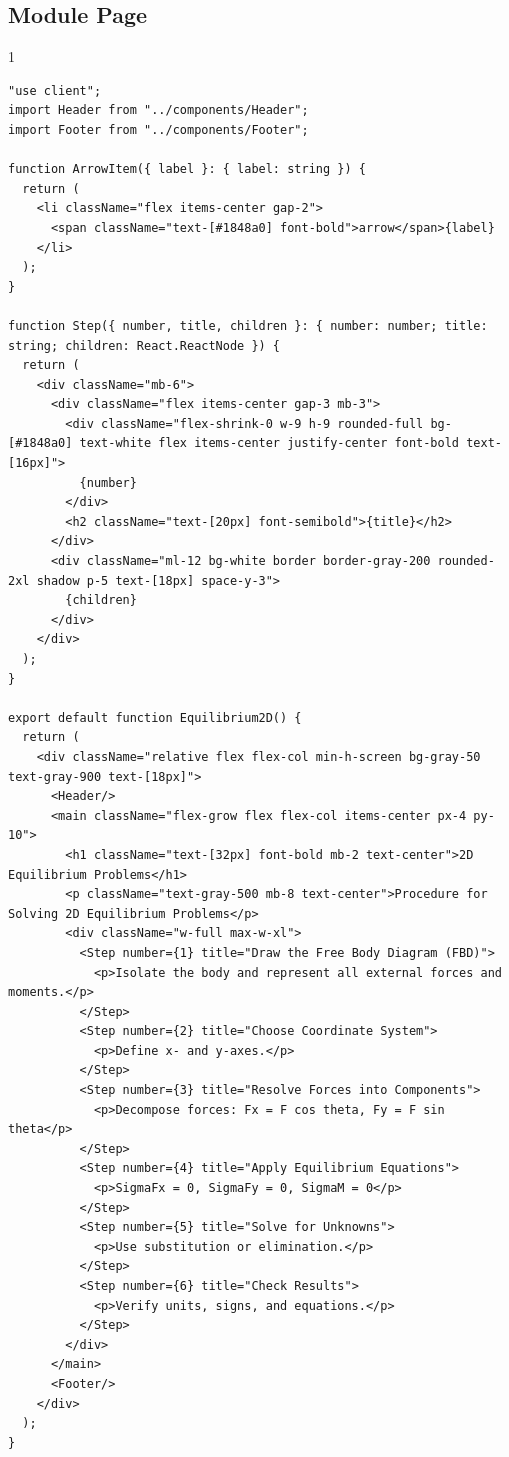 \subsection*{Module Page}
\begin{spacing}{1}
\begin{Verbatim}[breaklines=true, breaksymbolleft={}, breaksymbolright={}]
"use client";
import Header from "../components/Header";
import Footer from "../components/Footer";

function ArrowItem({ label }: { label: string }) {
  return (
    <li className="flex items-center gap-2">
      <span className="text-[#1848a0] font-bold">arrow</span>{label}
    </li>
  );
}

function Step({ number, title, children }: { number: number; title: string; children: React.ReactNode }) {
  return (
    <div className="mb-6">
      <div className="flex items-center gap-3 mb-3">
        <div className="flex-shrink-0 w-9 h-9 rounded-full bg-[#1848a0] text-white flex items-center justify-center font-bold text-[16px]">
          {number}
        </div>
        <h2 className="text-[20px] font-semibold">{title}</h2>
      </div>
      <div className="ml-12 bg-white border border-gray-200 rounded-2xl shadow p-5 text-[18px] space-y-3">
        {children}
      </div>
    </div>
  );
}

export default function Equilibrium2D() {
  return (
    <div className="relative flex flex-col min-h-screen bg-gray-50 text-gray-900 text-[18px]">
      <Header/>
      <main className="flex-grow flex flex-col items-center px-4 py-10">
        <h1 className="text-[32px] font-bold mb-2 text-center">2D Equilibrium Problems</h1>
        <p className="text-gray-500 mb-8 text-center">Procedure for Solving 2D Equilibrium Problems</p>
        <div className="w-full max-w-xl">
          <Step number={1} title="Draw the Free Body Diagram (FBD)">
            <p>Isolate the body and represent all external forces and moments.</p>
          </Step>
          <Step number={2} title="Choose Coordinate System">
            <p>Define x- and y-axes.</p>
          </Step>
          <Step number={3} title="Resolve Forces into Components">
            <p>Decompose forces: Fx = F cos theta, Fy = F sin theta</p>
          </Step>
          <Step number={4} title="Apply Equilibrium Equations">
            <p>SigmaFx = 0, SigmaFy = 0, SigmaM = 0</p>
          </Step>
          <Step number={5} title="Solve for Unknowns">
            <p>Use substitution or elimination.</p>
          </Step>
          <Step number={6} title="Check Results">
            <p>Verify units, signs, and equations.</p>
          </Step>
        </div>
      </main>
      <Footer/>
    </div>
  );
}
\end{Verbatim}
\end{spacing}